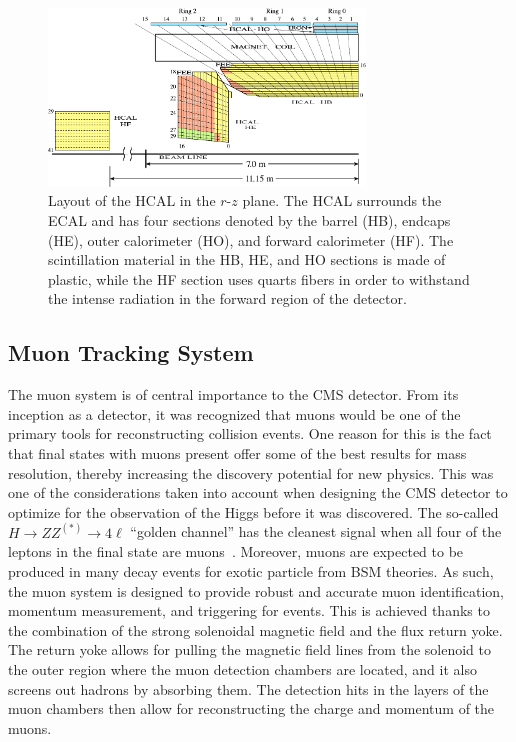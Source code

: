 \begin{figure}[htbp]
  \centering
  \includegraphics[width=0.75\textwidth]{fig/experiment/HCAL-HB-HE-HO-HF.pdf}
  \caption{
    Layout of the HCAL in the $r$-$z$ plane.
    The HCAL surrounds the ECAL and has four sections denoted by the barrel (HB), endcaps (HE), outer calorimeter (HO), and forward calorimeter (HF).
    The scintillation material in the HB, HE, and HO sections is made of plastic, while the HF section uses quarts fibers in order to withstand the intense radiation in the forward region of the detector.
  }
  \label{fig:CMSHCAL}
\end{figure}

\subsection{Muon Tracking System}
\label{subsec:muonTrack}

The muon system is of central importance to the CMS detector.
From its inception as a detector, it was recognized that muons would be one of the primary tools for reconstructing collision events.
One reason for this is the fact that final states with muons present offer some of the best results for mass resolution, thereby increasing the discovery potential for new physics.
This was one of the considerations taken into account when designing the CMS detector to optimize for the observation of the Higgs before it was discovered.
The so-called $H\to ZZ^{(*)}\to 4\ell$ ``golden channel'' has the cleanest signal when all four of the leptons in the final state are muons~\cite{Gainer_2011}.
Moreover, muons are expected to be produced in many decay events for exotic particle from BSM theories.
As such, the muon system is designed to provide robust and accurate muon identification, momentum measurement, and triggering for events.
This is achieved thanks to the combination of the strong solenoidal magnetic field and the flux return yoke.
The return yoke allows for pulling the magnetic field lines from the solenoid to the outer region where the muon detection chambers are located, and it also screens out hadrons by absorbing them.
The detection hits in the layers of the muon chambers then allow for reconstructing the charge and momentum of the muons.

